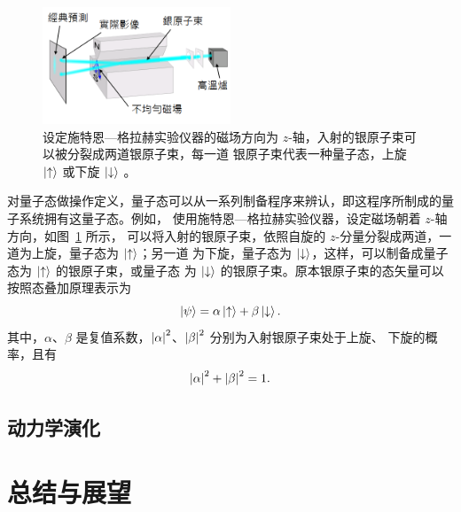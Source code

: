 \documentclass{fduthesis}
\begin{document}
\begin{figure}[htb]
  \centering
  \includegraphics[width=0.5\textwidth]{fduthesis-template-image.png}
  \caption[施特恩—格拉赫实验]{%
    设定施特恩—格拉赫实验仪器的磁场方向为 $z$-轴，入射的银原子束可以被分裂成两道银原子束，每一道
    银原子束代表一种量子态，上旋 $\ket{\uparrow}$ 或下旋 $\ket{\downarrow}$%
    \cite{wikimedia:stern-gerlach-experiment}。}
  \label{fig:stern-gerlach-experiment}
\end{figure}

对量子态做操作定义，量子态可以从一系列制备程序来辨认，即这程序所制成的量子系统拥有这量子态。例如，
使用施特恩—格拉赫实验仪器，设定磁场朝着 $z$-轴方向，如图~\ref{fig:stern-gerlach-experiment} 所示，
可以将入射的银原子束，依照自旋的 $z$-分量分裂成两道，一道为上旋，量子态为 $\ket{\uparrow}$；另一道
为下旋，量子态为 $\ket{\downarrow}$，这样，可以制备成量子态为 $\ket{\uparrow}$ 的银原子束，或量子态
为 $\ket{\downarrow}$ 的银原子束。原本银原子束的态矢量可以按照态叠加原理表示为
\begin{equation}
  \ket{\psi} = \alpha \ket{\uparrow} + \beta \ket{\downarrow}.
\end{equation}
其中，$\alpha$、$\beta$ 是复值系数，$\abs{\alpha}^2$、$\abs{\beta}^2$ 分别为入射银原子束处于上旋、
下旋的概率，且有
\begin{equation}
  \abs{\alpha}^2 + \abs{\beta}^2 = 1.
\end{equation}

\section{动力学演化}

\chapter{总结与展望}

\backmatter

\printbibliography
\end{document}
